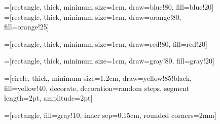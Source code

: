 \begin{figure}[htbp]
\small
\centering

=[rectangle,
                                    thick,
                                    minimum size=1cm,
                                    draw=blue!80,
                                    fill=blue!20]
=[rectangle,
                                                thick,
                                                minimum size=1cm,
                                                draw=orange!80,
                                                fill=orange!25]

=[rectangle,
                                    thick,
                                    minimum size=1cm,
                                    draw=red!80,
                                    fill=red!20]

=[rectangle,
                                    thick,
                                    minimum size=1cm,
                                    draw=gray!80,
                                    fill=gray!20]

=[circle,
                                    thick,
                                    minimum size=1.2cm,
                                    draw=yellow!85!black,
                                    fill=yellow!40,
                                    decorate,
                                    decoration={random steps,
                                                            segment length=2pt,
                                                            amplitude=2pt}]

=[rectangle,
                                                fill=gray!10,
                                                inner sep=0.15cm,
                                                rounded corners=2mm]


\end{figure}
